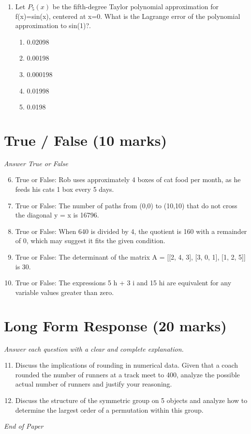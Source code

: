 \documentclass[12pt]{article}
\begin{document}
\begin{enumerate}[label=\arabic*.]
\begin{enumerate}[label=(\alph*)]
    \item 40
    \item 22
\end{enumerate}
\item Let $P_5(x)$ be the fifth-degree Taylor polynomial approximation for f(x)=sin(x), centered at x=0. What is the Lagrange error of the polynomial approximation to sin(1)?.
\begin{enumerate}[label=(\alph*)]
    \item 0.02098
    \item 0.00198
    \item 0.000198
    \item 0.01998
    \item 0.0198
\end{enumerate}
\end{enumerate}

\section*{True / False (10 marks)}
\textit{Answer True or False}
\begin{enumerate}[label=\arabic*.]
\setcounter{enumi}{5}
\item True or False: Rob uses approximately 4 boxes of cat food per month, as he feeds his cats 1 box every 5 days.
\item True or False: The number of paths from (0,0) to (10,10) that do not cross the diagonal y = x is 16796.
\item True or False: When 640 is divided by 4, the quotient is 160 with a remainder of 0, which may suggest it fits the given condition.
\item True or False: The determinant of the matrix A = [[2, 4, 3], [3, 0, 1], [1, 2, 5]] is 30.
\item True or False: The expressions 5 h + 3 i and 15 hi are equivalent for any variable values greater than zero.
\end{enumerate}

\section*{Long Form Response (20 marks)}
\textit{Answer each question with a clear and complete explanation.}
\begin{enumerate}[label=\arabic*.]
\setcounter{enumi}{10}
\item Discuss the implications of rounding in numerical data. Given that a coach rounded the number of runners at a track meet to 400, analyze the possible actual number of runners and justify your reasoning.
\item Discuss the structure of the symmetric group on 5 objects and analyze how to determine the largest order of a permutation within this group.
\end{enumerate}

\vfill
\noindent\textit{End of Paper}
\end{document}
